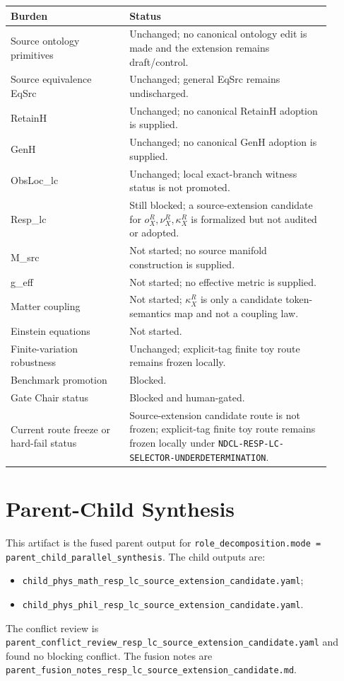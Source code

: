 \documentclass[11pt]{article}
\begin{document}
\begin{center}
\begin{tabular}{p{0.33\linewidth}p{0.57\linewidth}}
\hline
Burden & Status \\
\hline
Source ontology primitives & Unchanged; no canonical ontology edit is made and the extension remains draft/control. \\
Source equivalence EqSrc & Unchanged; general EqSrc remains undischarged. \\
RetainH & Unchanged; no canonical RetainH adoption is supplied. \\
GenH & Unchanged; no canonical GenH adoption is supplied. \\
ObsLoc\_lc & Unchanged; local exact-branch witness status is not promoted. \\
Resp\_lc & Still blocked; a source-extension candidate for \(o_X^R,\nu_X^R,\kappa_X^R\) is formalized but not audited or adopted. \\
M\_src & Not started; no source manifold construction is supplied. \\
g\_eff & Not started; no effective metric is supplied. \\
Matter coupling & Not started; \(\kappa_X^R\) is only a candidate token-semantics map and not a coupling law. \\
Einstein equations & Not started. \\
Finite-variation robustness & Unchanged; explicit-tag finite toy route remains frozen locally. \\
Benchmark promotion & Blocked. \\
Gate Chair status & Blocked and human-gated. \\
Current route freeze or hard-fail status & Source-extension candidate route is not frozen; explicit-tag finite toy route remains frozen locally under \texttt{NDCL-RESP-LC-SELECTOR-UNDERDETERMINATION}. \\
\hline
\end{tabular}
\end{center}

\section{Parent-Child Synthesis}

This artifact is the fused parent output for
\texttt{role\_decomposition.mode = parent\_child\_parallel\_synthesis}.
The child outputs are:
\begin{itemize}
  \item \texttt{child\_phys\_math\_resp\_lc\_source\_extension\_candidate.yaml};
  \item \texttt{child\_phys\_phil\_resp\_lc\_source\_extension\_candidate.yaml}.
\end{itemize}
The conflict review is
\texttt{parent\_conflict\_review\_resp\_lc\_source\_extension\_candidate.yaml}
and found no blocking conflict. The fusion notes are
\texttt{parent\_fusion\_notes\_resp\_lc\_source\_extension\_candidate.md}.
\end{document}
